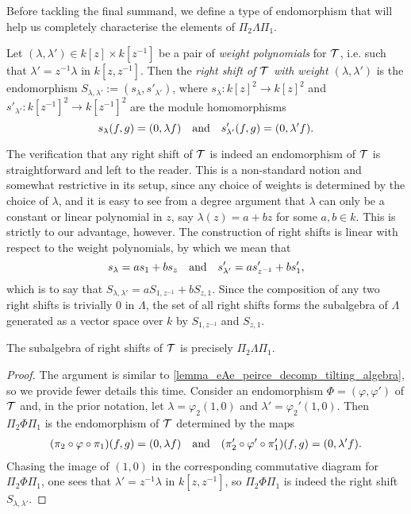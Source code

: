 Before tackling the final summand, we define a type of endomorphism
that will help us completely characterise the elements of $\Pi_2 \Lambda \Pi_1$.

\begin{definition}
  Let $(\lambda, \lambda') \in k[z] \times k[z^{-1}]$ be a pair of
  \emph{weight polynomials} for $\mathcal{T}$, i.e. such that $\lambda' =
  z^{-1} \lambda$ in $k[z, z^{-1}]$.
  Then the \emph{right shift of $\mathcal{T}$ with weight $(\lambda,
  \lambda')$} is the endomorphism $S_{\lambda, \lambda'} :=
  (s_\lambda, s'_{\lambda'})$, where
  $s_\lambda: k[z]^2 \to k[z]^2$ and $s'_{\lambda'}: k[z^{-1}]^2 \to
  k[z^{-1}]^2$ are the module homomorphisms
  \[
    s_\lambda(f, g) = (0, \lambda f) \quad \text{and} \quad s'_{\lambda'}(f, g) =
    (0, \lambda' f).
  \]
  \vspace{-24pt}
\end{definition}

The verification that any right shift of $\mathcal{T}$ is indeed an
endomorphism of $\mathcal{T}$ is straightforward and left to the reader.
This is a non-standard notion and somewhat restrictive in its setup,
since any choice of weights is determined by the choice of $\lambda$,
and it is easy to see from a degree argument that $\lambda$ can only
be a constant or linear polynomial in $z$, say $\lambda(z) = a + bz$
for some $a, b \in k$.
This is strictly to our advantage, however.
The construction of right shifts is linear with respect to the weight
polynomials, by which we mean that
\[
  s_\lambda = a s_1 + b s_z
  \quad \text{and} \quad
  s'_{\lambda'} = a s'_{z^{-1}} + b s'_1,
\]
which is to say that $S_{\lambda, \lambda'} = a S_{1, z^{-1}} + b S_{z, 1}$.
Since the composition of any two right shifts is trivially 0 in
$\Lambda$, the set of all right shifts forms the subalgebra of
$\Lambda$ generated as a vector space over $k$ by $S_{1, z^{-1}}$ and
$S_{z, 1}$.

\begin{lemma}
  The subalgebra of right shifts of $\mathcal{T}$ is precisely $\Pi_2
  \Lambda \Pi_1$.
\end{lemma}

\begin{proof}
  The argument is similar to
  \cref{lemma_eAe_peirce_decomp_tilting_algebra}, so we provide fewer
  details this time.
  Consider an endomorphism $\Phi = (\varphi, \varphi')$ of $\mathcal{T}$
  and, in the prior notation, let $\lambda = \varphi_2(1, 0)$ and
  $\lambda' = \varphi_2'(1, 0)$.
  Then $\Pi_2 \Phi \Pi_1$ is the endomorphism of $\mathcal{T}$ determined
  by the maps
  \begin{align*}
    (\pi_2 \circ \varphi \circ \pi_1)(f, g)
    = (0, \lambda f)
    \quad \text{and} \quad
    (\pi_2' \circ \varphi' \circ \pi_1')(f, g)
    = (0, \lambda' f).
  \end{align*}
  Chasing the image of $(1, 0)$ in the corresponding commutative
  diagram for $\Pi_2 \Phi \Pi_1$, one sees that $\lambda' = z^{-1}
  \lambda$ in $k[z, z^{-1}]$, so $\Pi_2 \Phi \Pi_1$ is indeed the
  right shift $S_{\lambda, \lambda'}$.
\end{proof}

